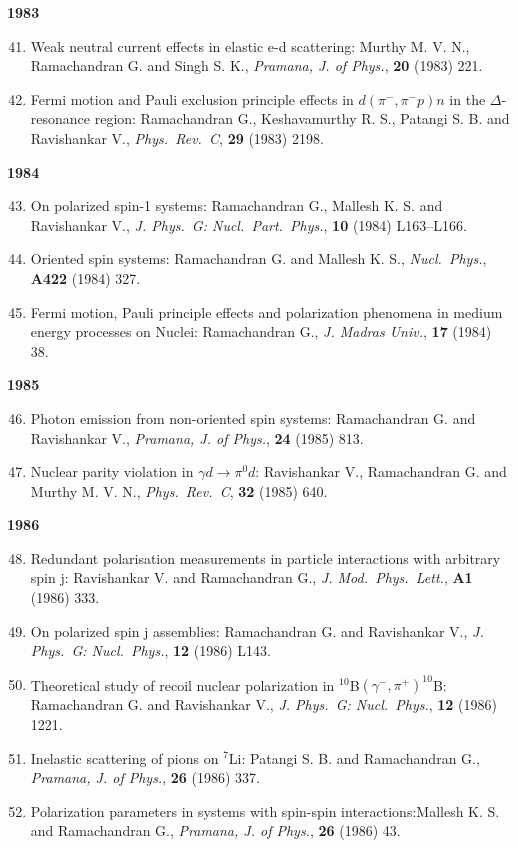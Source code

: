 \textbf{1983}
\begin{enumerate}
\setcounter{enumi}{40}
\item Weak neutral current effects in elastic e-d scattering: Murthy M. V. N., Ramachandran G. and Singh S. K., \textit{Pramana, J. of Phys.}, {\bf 20} (1983) 221.
\item Fermi motion and Pauli exclusion principle effects in $d(\pi^{-},\pi^{-}p)n$ in the $\Delta$-resonance region: Ramachandran G., Keshavamurthy R. S., Patangi S. B. and Ravishankar V., \textit{Phys.\ Rev.\ C}, {\bf 29} (1983) 2198.
\end{enumerate}
\textbf{1984}
\begin{enumerate}
\setcounter{enumi}{42}
\item On polarized spin-1 systems: Ramachandran G., Mallesh K. S. and Ravishankar V., \textit{J. Phys.\ G: Nucl.\ Part.\ Phys.}, {\bf 10} (1984) L163--L166.
\item Oriented spin systems: Ramachandran G. and Mallesh K. S., \textit{Nucl.\ Phys.}, {\bf A422} (1984) 327.
\item Fermi motion, Pauli principle effects and polarization phenomena in medium energy processes on Nuclei: Ramachandran G., \textit{J. Madras Univ.}, {\bf 17} (1984) 38.
\end{enumerate}
\textbf{1985}
\begin{enumerate}
\setcounter{enumi}{45}
\item Photon emission from non-oriented spin systems: Ramachandran G. and Ravishankar V., \textit{Pramana, J. of Phys.}, {\bf 24} (1985) 813.
\item Nuclear parity violation in $\gamma d\to \pi^{0}d$: Ravishankar V., Ramachandran G. and Murthy M. V. N., \textit{Phys.\ Rev.\ C}, {\bf 32} (1985) 640.
\end{enumerate}
\textbf{1986}
\begin{enumerate}
\setcounter{enumi}{47}
\item Redundant polarisation measurements in particle interactions with arbitrary spin j: Ravishankar V. and Ramachandran G., \textit{J. Mod.\ Phys.\ Lett.}, {\bf A1} (1986) 333.
\item On polarized spin j assemblies: Ramachandran G. and Ravishankar V., \textit{J. Phys.\ G: Nucl.\ Phys.}, {\bf 12} (1986) L143.
\item Theoretical study of recoil nuclear polarization in $^{10}$B$(\gamma^{-},\pi^{+})^{10}$B: Ramachandran G. and Ravishankar V., \textit{J. Phys.\ G: Nucl.\ Phys.}, {\bf 12} (1986) 1221.
\item Inelastic scattering of pions on $^{7}$Li: Patangi S. B. and Ramachandran G., \textit{Pramana, J. of Phys.}, {\bf 26} (1986) 337.
\item Polarization parameters in systems with spin-spin interactions:\break Mallesh K. S. and Ramachandran G., \textit{Pramana, J. of Phys.}, {\bf 26} (1986) 43.
\end{enumerate}
